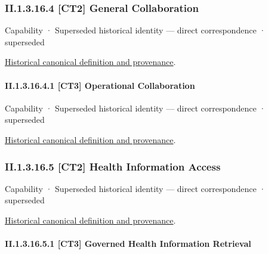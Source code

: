 \subsubsection*{II.1.3.16.4 [CT2] General Collaboration}
\label{navigation:II.1.3.16.4}

\label{element:4f58c82aca7a4b54aeb6e2920ce5c12a}
{\small Capability · Superseded historical identity — direct correspondence · superseded}\par
\href{../../../../continuum/strategy/capability/4f58c82aca7a4b54aeb6e2920ce5c12a.md}{Historical canonical definition and provenance}.\par
\paragraph*{II.1.3.16.4.1 [CT3] Operational Collaboration}
\label{navigation:II.1.3.16.4.1}

\label{element:99e9d9763ec94140b7d7642f4b5966f6}
{\small Capability · Superseded historical identity — direct correspondence · superseded}\par
\href{../../../../continuum/strategy/capability/99e9d9763ec94140b7d7642f4b5966f6.md}{Historical canonical definition and provenance}.\par
\subsubsection*{II.1.3.16.5 [CT2] Health Information Access}
\label{navigation:II.1.3.16.5}

\label{element:5019ae9f2cdc45a1b2de97bc0f5a313d}
{\small Capability · Superseded historical identity — direct correspondence · superseded}\par
\href{../../../../continuum/strategy/capability/5019ae9f2cdc45a1b2de97bc0f5a313d.md}{Historical canonical definition and provenance}.\par
\paragraph*{II.1.3.16.5.1 [CT3] Governed Health Information Retrieval}
\label{navigation:II.1.3.16.5.1}

